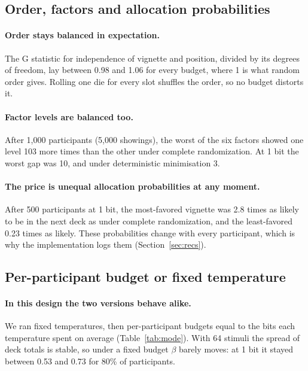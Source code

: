 \documentclass[11pt]{article}
\begin{document}
\subsection{Order, factors and allocation probabilities}\label{sec:order}

\paragraph{Order stays balanced in expectation.} The G statistic for independence of vignette and position, divided by its degrees of freedom, lay between 0.98 and 1.06 for every budget, where 1 is what random order gives. Rolling one die for every slot shuffles the order, so no budget distorts it.

\paragraph{Factor levels are balanced too.} After 1,000 participants (5,000 showings), the worst of the six factors showed one level 103 more times than the other under complete randomization. At 1 bit the worst gap was 10, and under deterministic minimisation 3.

\paragraph{The price is unequal allocation probabilities at any moment.} After 500 participants at 1 bit, the most-favored vignette was 2.8 times as likely to be in the next deck as under complete randomization, and the least-favored 0.23 times as likely. These probabilities change with every participant, which is why the implementation logs them (Section~\ref{sec:recs}).

\subsection{Per-participant budget or fixed temperature}\label{sec:mode}

\paragraph{In this design the two versions behave alike.} We ran fixed temperatures, then per-participant budgets equal to the bits each temperature spent on average (Table~\ref{tab:mode}). With 64 stimuli the spread of deck totals is stable, so under a fixed budget $\beta$ barely moves: at 1 bit it stayed between 0.53 and 0.73 for 80\% of participants.
\end{document}
